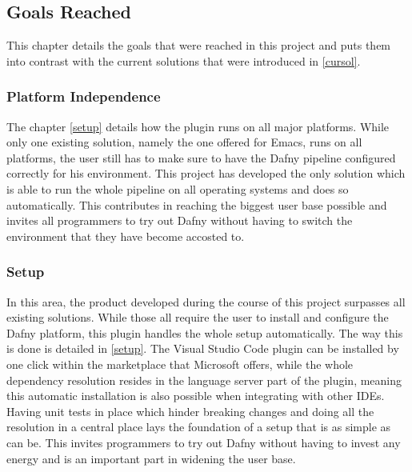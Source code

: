 \subsection{Goals Reached}\label{golrech}
This chapter details the goals that were reached in this project and puts them into contrast with the current solutions that were introduced in \ref{cursol}.
\subsubsection{Platform Independence}
The chapter \ref{setup} details how the plugin runs on all major platforms. While only one existing solution, namely the one offered for Emacs, runs on all platforms, the user still has to make sure to have the Dafny pipeline configured correctly for his environment. \newline
This project has developed the only solution which is able to run the whole pipeline on all operating systems and does so automatically. This contributes in reaching the biggest user base possible and invites all programmers to try out Dafny without having to switch the environment that they have become accosted to.  
\subsubsection{Setup}
In this area, the product developed during the course of this project surpasses all existing solutions. While those all require the user to install and configure the Dafny platform, this plugin handles the whole setup automatically. The way this is done is detailed in \ref{setup}. The Visual Studio Code plugin can be installed by one click within the marketplace that Microsoft offers, while the whole dependency resolution resides in the language server part of the plugin, meaning this automatic installation is also possible when integrating with other IDEs. \newline
Having unit tests in place which hinder breaking changes and doing all the resolution in a central place lays the foundation of a setup that is as simple as can be. This invites programmers to try out Dafny without having to invest any energy and is an important part in widening the user base. 

